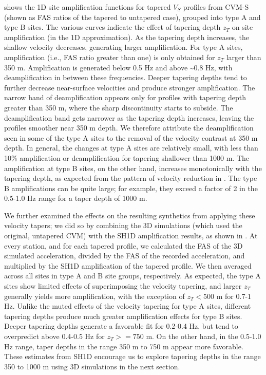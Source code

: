  shows the 1D site amplification functions for tapered $V_S$ profiles from CVM-S (shown as FAS ratios of the tapered to untapered case), grouped into type A and type B sites. The various curves indicate the effect of tapering depth $z_T$ on site amplification (in the 1D approximation). As the tapering depth increases, the shallow velocity decreases, generating larger amplification. For type A sites, amplification (i.e., FAS ratio greater than one) is only obtained for $z_T$ larger than 350 m. Amplification is generated below 0.5 Hz and above \textasciitilde 0.8 Hz, with deamplification in between these frequencies. Deeper tapering depths tend to further decrease near-surface velocities and produce stronger amplification. The narrow band of deamplification appears only for profiles with tapering depth greater than 350 m, where the sharp discontinuity starts to subside. The deamplification band gets narrower as the tapering depth increases, leaving the profiles smoother near 350 m depth. We therefore attribute the deamplification seen in some of the type A sites to the removal of the velocity contrast at 350 m depth. In general, the changes at type A sites are relatively small, with less than 10\% amplification or deamplification for tapering shallower than 1000 m. The amplification at type B sites, on the other hand, increases monotonically with the tapering depth, as expected from the pattern of velocity reduction in . The type B amplifications can be quite large; for example, they exceed a factor of 2 in the 0.5-1.0 Hz range for a taper depth of 1000 m.

We further examined the effects on the resulting synthetics from applying these velocity tapers; we did so by combining the 3D simulations (which used the original, untapered CVM) with the SH1D amplification results, as shown in . At every station, and for each tapered profile, we calculated the FAS of the 3D simulated acceleration, divided by the FAS of the recorded acceleration, and multiplied by the SH1D amplification of the tapered profile. We then averaged across all sites in type A and B site groups, respectively. As expected, the type A sites show limited effects of superimposing the velocity tapering, and larger $z_T$ generally yields more amplification, with the exception of $z_T < 500$ m for 0.7-1 Hz. Unlike the muted effects of the velocity tapering for type A sites, different tapering depths produce much greater amplification effects for type B sites. Deeper tapering depths generate a favorable fit for 0.2-0.4 Hz, but tend to overpredict above 0.4-0.5 Hz for $z_T >= 750$ m. On the other hand, in the 0.5-1.0 Hz range, taper depths in the range 350 m to 750 m appear more favorable. These estimates from SH1D encourage us to explore tapering depths in the range 350 to 1000 m using 3D simulations in the next section.

